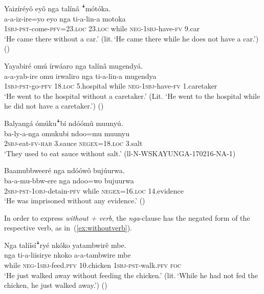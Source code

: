 \documentclass[output=paper,colorlinks,citecolor=brown,draftmode]{langscibook}
\begin{document}
\ea \label{ex:ruulietal:29}
\begin{xlist}
\ex \label{ex:withoutnoun2}\label{ex:ruulietal:29a}
    \glll  Yaizíréyô eyô nga talínâ ꜜmótóka.\\
	        a-a-iz-ire=yo eyo nga ti-a-lin-a motoka\\
	    	\textsc{1sbj}-\textsc{pst}-come-\textsc{pfv}=23.\textsc{loc} 23.\textsc{loc} while \textsc{neg}-\textsc{1sbj}-have-\textsc{fv} 9.car\\
	\glt ‘He came there without a car.' (lit.\,`He came there while he does not have a car.') (\citealt[129]{NamyaloEtAl2021})

\ex \label{ex:withoutnoun}\label{ex:ruulietal:29b}
	\glll   Yayabiré omú írwáaro nga talínâ mugendyá.\\
	        a-a-yab-ire		omu	irwaliro nga	ti-a-lin-a		mugendya\\ 
	    	\textsc{1sbj}-\textsc{pst}-go-\textsc{pfv} 	18\textsc{.loc}	5.hospital while	\textsc{neg}-1\textsc{sbj}-have-\textsc{fv}	1.caretaker\\
    \glt ‘He went to the hospital without a caretaker.’ (Lit. ‘He went to the hospital while he did not have a caretaker.’) (\citealt[129]{NamyaloEtAl2021})

\ex \label{ex:withoutndoo}\label{ex:ruulietal:29c}
    \glll Balyangá ómúkuꜜbí ndóómû muunyú.\\
        ba-ly-a-nga	omukubi	ndoo=mu	muunyu\\
	        2\textsc{sbj}-eat-\textsc{fv-hab}	3.sauce \textsc{negex}=18.\textsc{loc}	3.salt\\
	\glt ‘They used to eat sauce without salt.’ (ll-N-WSKAYUNGA-170216-NA-1)

\ex \label{ex:withoutngandoo}\label{ex:ruulietal:29d}
    \glll Baamubbweeré nga ndóówô bujúurwa.\\
    ba-a-mu-bbw-ere nga ndoo=wo bujuurwa\\
	2\textsc{sbj}-\textsc{pst}-1\textsc{obj}-detain-\textsc{pfv}	while	\textsc{negex}=16.\textsc{loc}	14.evidence\\
	\glt ‘He was imprisoned without any evidence.’ (\citealt[172]{NamyaloEtAl2021})
\end{xlist} 
\z

In order to express \textit{without + verb}, the \textit{nga}-clause has the negated form of the respective verb, as in~(\ref{ex:withoutverb}).

\ea \label{ex:withoutverb}
	\glll   Nga talíísíꜜryé nkóko yatambwirê mbe.\\
	        nga ti-a-liisirye nkoko a-a-tambwire mbe\\
	    	while \textsc{neg}-\textsc{1sbj}-feed.\textsc{pfv} 10.chicken \textsc{1sbj}-\textsc{pst}-walk.\textsc{pfv} \textsc{foc}\\
	\glt ‘He just walked away without feeding the chicken.' (lit.\,`While he had not fed the chicken, he just walked away.') (\citealt[130]{NamyaloEtAl2021})
\z
\end{document}
